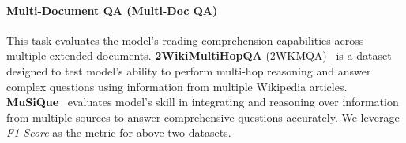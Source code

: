 \paragraph{Multi-Document QA (Multi-Doc QA)} This task evaluates the model's reading comprehension capabilities across multiple extended documents. \textbf{2WikiMultiHopQA} (2WKMQA)~\cite{DBLP:conf/coling/HoNSA20} is a dataset designed to test model's ability to perform multi-hop reasoning and answer complex questions using information from multiple Wikipedia articles. \textbf{MuSiQue}~\cite{DBLP:journals/tacl/TrivediBKS22} evaluates model's skill in integrating and reasoning over information from multiple sources to answer comprehensive questions accurately. We leverage \textit{F1 Score} as the metric for above two datasets.

\begin{table}[!t]
\centering
{}
\end{table}
